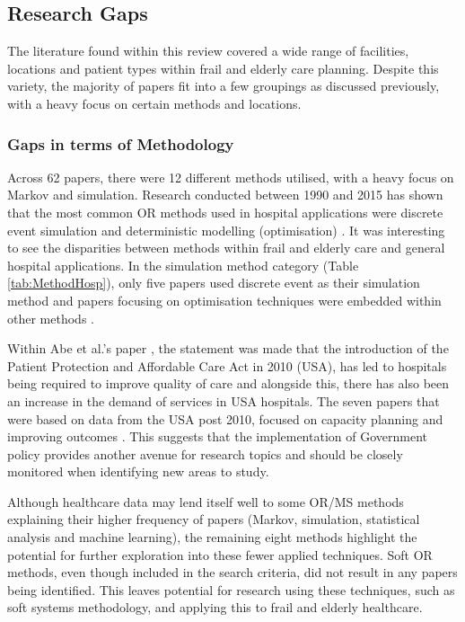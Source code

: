 \documentclass[../thesis.tex]{subfiles}
\begin{document}
\subsection{Research Gaps} \label{Sec:Research} 
The literature found within this review covered a wide range of facilities, locations and patient types within frail and elderly care planning. Despite this variety, the majority of papers fit into a few groupings as discussed previously, with a heavy focus on certain methods and locations.

\subsubsection{Gaps in terms of Methodology}
Across 62 papers, there were 12 different methods utilised, with a heavy focus on Markov and simulation. Research conducted between 1990 and 2015 has shown that the most common OR methods used in hospital applications were discrete event simulation and deterministic modelling (optimisation) \cite{Abe1,Abe2}. It was interesting to see the disparities between methods within frail and elderly care and general hospital applications. In the simulation method category (Table \ref{tab:MethodHosp}), only five papers used discrete event as their simulation method \cite{Franck, Katsaliaki, Onggo, Zhang1, Zhang2} and papers focusing on optimisation techniques were embedded within other methods \cite{Bae, Garg1, Lin,Bidhandi, Silvester, Tao, Yalcindag, Zhang2}. 

 Within Abe et al.’s paper \cite{Abe2}, the statement was made that the introduction of the Patient Protection and Affordable Care Act in 2010 (USA), has led to hospitals being required to improve quality of care and alongside this, there has also been an increase in the demand of services in USA hospitals. The seven papers that were based on data from the USA post 2010, focused on capacity planning and improving outcomes \cite{Arling,Bae, Gassoumis,Guo,YLi, Wallace, Zychlinski}. This suggests that the implementation of Government policy provides another avenue for research topics and should be closely monitored when identifying new areas to study.
 
 Although healthcare data may lend itself well to some OR/MS methods explaining their higher frequency of papers (Markov, simulation, statistical analysis and machine learning), the remaining eight methods highlight the potential for further exploration into these fewer applied techniques. Soft OR methods, even though included in the search criteria, did not result in any papers being identified. This leaves potential for research using these techniques, such as soft systems methodology, and applying this to frail and elderly healthcare.
 
\end{document}
